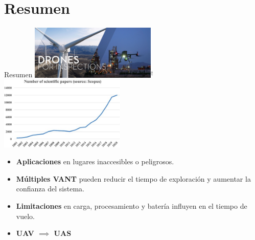 \documentclass[
  24pt, %
  aspectratio=169, %
]{beamer}
\begin{document}
\section{Resumen}
\begin{frame}{Resumen}
  \bigskip %
  \centering
  \includegraphics[width=0.45\textwidth,height=0.35\textheight]{DJI_B1}$^\dag$
  \hfil
  \includegraphics[width=0.45\textwidth,height=0.35\textheight]{survey_chart.jpg}\footnotemark
  \vspace{2pt}\\
  
  \begin{itemize}
  \item \textbf{Aplicaciones} en lugares inaccesibles o peligrosos.
  \item \textbf{Múltiples VANT} pueden reducir el tiempo de exploración y aumentar la confianza del sistema.
  \item \textbf{Limitaciones} en carga, procesamiento y batería influyen en el tiempo de vuelo.
  \item \textbf{UAV $\implies$ UAS}
  \end{itemize}

\end{frame}
\end{document}
